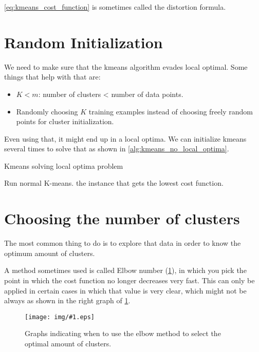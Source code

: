 \documentclass[10pt]{extarticle}
\newcommand{\stdfig}[2]{
    \begin{figure}
    \centering
    \texttt{[image: img/\#1.eps]}
    \caption{#2}
    \label{fig:#1}
    \end{figure}
}
\begin{document}
\cref{eq:kmeans_cost_function} is sometimes called the distortion
formula.

\section{Random Initialization}\label{random-initialization}

We need to make sure that the kmeans algorithm evades local optimal.
Some things that help with that are:

\begin{itemize}
\itemsep1pt\parskip0pt
\item
  $K < m$: number of clusters \textless{} number of data points.
\item
  Randomly choosing $K$ training examples instead of choosing freely
  random points for cluster initialization.
\end{itemize}

Even using that, it might end up in a local optima. We can initialize
kmeans several times to solve that as shown in
\cref{alg:kmeans_no_local_optima}.

\begin{algorithm}
\caption{Kmeans solving local optima problem}\label{alg:kmeans_no_local_optima}
\begin{algorithmic}[1]
 
        \State Run normal K-means.
    \EndFor
    \State \Return the instance that gets the lowest cost function.
\EndFunction
\end{algorithmic}
\end{algorithm}

\section{Choosing the number of
clusters}\label{choosing-the-number-of-clusters}

The most common thing to do is to explore that data in order to know the
optimum amount of clusters. \smallskip

A method sometimes used is called Elbow number
(\cref{fig:elbow_method}), in which you pick the point in which the cost
function no longer decreases very fast. This can only be applied in
certain cases in which that value is very clear, which might not be
always as shown in the right graph of \cref{fig:elbow_method}. \bigskip

\stdfig{elbow_method}{Graphs indicating when to use the elbow method to select the optimal amount of clusters.}
\end{document}
